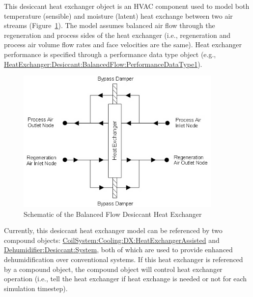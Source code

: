 This desiccant heat exchanger object is an HVAC component used to model both temperature (sensible) and moisture (latent) heat exchange between two air streams (Figure~\ref{fig:schematic-of-the-balanced-flow-desiccant-heat}). The model assumes balanced air flow through the regeneration and process sides of the heat exchanger (i.e., regeneration and process air volume flow rates and face velocities are the same). Heat exchanger performance is specified through a performance data type object (e.g., \hyperref[heatexchangerdesiccantbalancedflowperformancedatatype1]{HeatExchanger:Desiccant:BalancedFlow:PerformanceDataType1}).

\begin{figure}[hbtp] %
\centering
\includegraphics[width=0.9\textwidth, height=0.9\textheight, keepaspectratio=true]{media/image424.png}
\caption{Schematic of the Balanced Flow Desiccant Heat Exchanger \protect \label{fig:schematic-of-the-balanced-flow-desiccant-heat}}
\end{figure}

Currently, this desiccant heat exchanger model can be referenced by two compound objects: \hyperref[coilsystemcoolingdxheatexchangerassisted]{CoilSystem:Cooling:DX:HeatExchangerAssisted} and \hyperref[dehumidifierdesiccantsystem]{Dehumidifier:Desiccant:System}, both of which are used to provide enhanced dehumidification over conventional systems. If this heat exchanger is referenced by a compound object, the compound object will control heat exchanger operation (i.e., tell the heat exchanger if heat exchange is needed or not for each simulation timestep).

